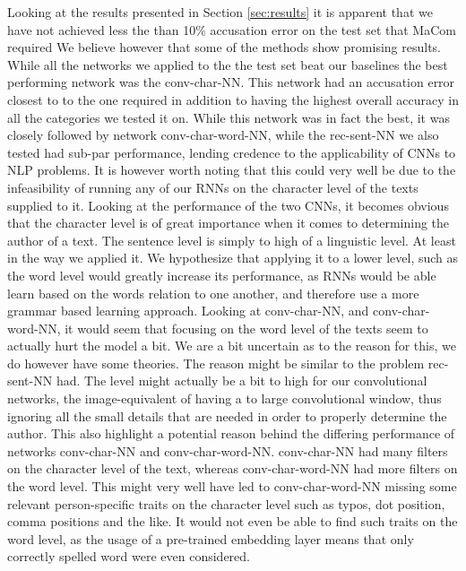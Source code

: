 Looking at the results presented in Section \ref{sec:results} it is apparent
that we have not achieved less the than 10\% accusation error on the test
set that MaCom required We believe however that some of the methods show
promising results. While all the networks we applied to the the test set beat
our baselines the best performing network was the \gls{conv-char-NN}. This
network had an accusation error closest to to the one required in addition to
having the highest overall accuracy in all the categories we tested it on.
While this network was in fact the best, it was closely followed by network
\gls{conv-char-word-NN}, while the \gls{rec-sent-NN} we also tested had sub-par
performance, lending credence to the applicability of \gls{CNN}s to \gls{NLP}
problems. It is however worth noting that this could very well be due to the
infeasibility of running any of our \gls{RNN}s on the character level of the
texts supplied to it. Looking at the performance of the two \gls{CNN}s, it
becomes obvious that the character level is of great importance when it comes
to determining the author of a text. The sentence level is simply to high of
a linguistic level. At least in the way we applied it. We hypothesize that
applying it to a lower level, such as the word level would greatly increase its
performance, as \gls{RNN}s would be able learn based on the words relation to
one another, and therefore use a more grammar based learning approach. Looking
at \gls{conv-char-NN}, and \gls{conv-char-word-NN}, it would seem that focusing
on the word level of the texts seem to actually hurt the model a bit. We are a
bit uncertain as to the reason for this, we do however have some theories. The
reason might be similar to the problem \gls{rec-sent-NN} had. The level might
actually be a bit to high for our convolutional networks, the image-equivalent
of having a to large convolutional window, thus ignoring all the small details
that are needed in order to properly determine the author. This also highlight a
potential reason behind the differing performance of networks \gls{conv-char-NN}
and \gls{conv-char-word-NN}. \gls{conv-char-NN} had many filters on the
character level of the text, whereas \gls{conv-char-word-NN} had more filters on
the word level. This might very well have led to \gls{conv-char-word-NN} missing
some relevant person-specific traits on the character level such as typos, dot
position, comma positions and the like. It would not even be able to find such
traits on the word level, as the usage of a pre-trained embedding layer means
that only correctly spelled word were even considered.

